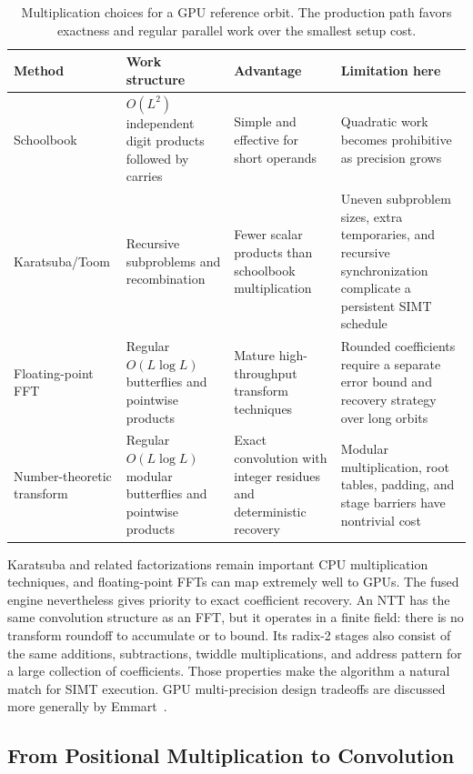 \begin{table}[!htbp]
\centering
\small
\caption[Multiplication choices for a GPU reference orbit]{Multiplication choices for a GPU
  reference orbit.  The production path favors exactness and regular parallel work over the
  smallest setup cost.}
\label{tab:gpu-multiply-choices}
\begin{tabularx}{\textwidth}{lXXX}
\hline
\textbf{Method} & \textbf{Work structure} & \textbf{Advantage} & \textbf{Limitation here} \\
\hline
Schoolbook
  & $O(L^2)$ independent digit products followed by carries
  & Simple and effective for short operands
  & Quadratic work becomes prohibitive as precision grows \\
Karatsuba/Toom
  & Recursive subproblems and recombination
  & Fewer scalar products than schoolbook multiplication
  & Uneven subproblem sizes, extra temporaries, and recursive synchronization complicate a
    persistent SIMT schedule \\
Floating-point FFT
  & Regular $O(L\log L)$ butterflies and pointwise products
  & Mature high-throughput transform techniques
  & Rounded coefficients require a separate error bound and recovery strategy over long orbits \\
Number-theoretic transform
  & Regular $O(L\log L)$ modular butterflies and pointwise products
  & Exact convolution with integer residues and deterministic recovery
  & Modular multiplication, root tables, padding, and stage barriers have nontrivial cost \\
\hline
\end{tabularx}
\end{table}

Karatsuba and related factorizations remain important CPU multiplication
techniques, and floating-point FFTs can map extremely well to GPUs.  The fused
engine nevertheless gives priority to exact coefficient recovery.  An NTT has
the same convolution structure as an FFT, but it operates in a finite field:
there is no transform roundoff to accumulate or to bound.  Its radix-2 stages
also consist of the same additions, subtractions, twiddle multiplications, and
address pattern for a large collection of coefficients.  Those properties make
the algorithm a natural match for SIMT execution.  GPU multi-precision design
tradeoffs are discussed more generally by Emmart~\cite{Emmart_GPU_MultiPrecision}.

\subsection{From Positional Multiplication to Convolution}
\label{subsec:ntt-convolution-introduction}

